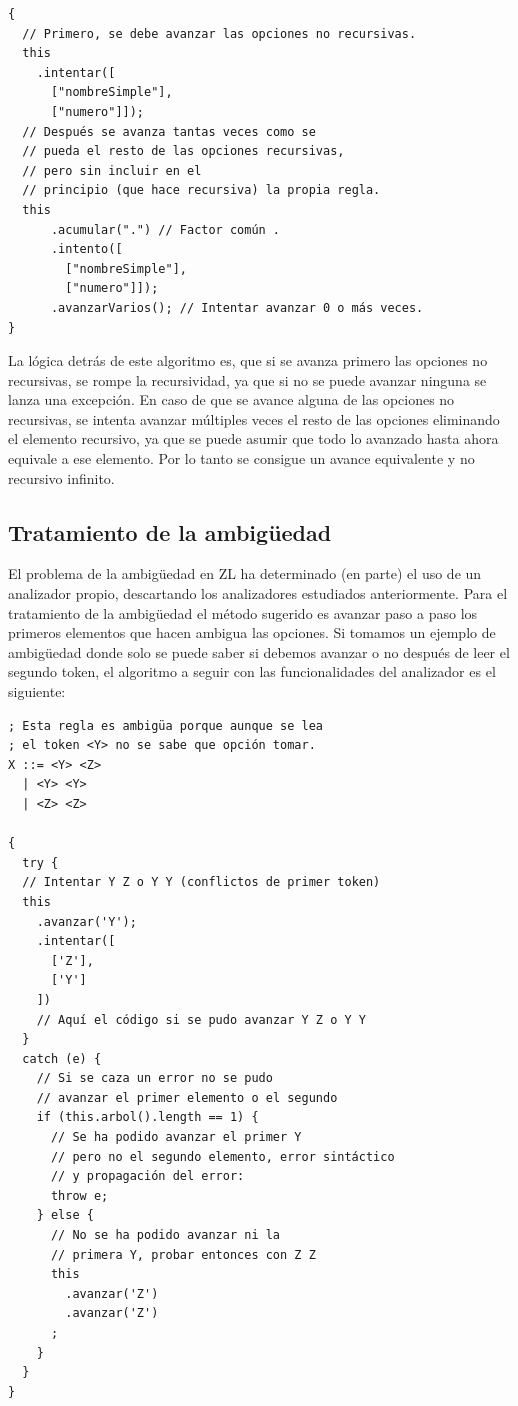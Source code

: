\documentclass{report}
\begin{document}
\begin{BVerbatim}
{
  // Primero, se debe avanzar las opciones no recursivas.
  this
    .intentar([
      ["nombreSimple"],
      ["numero"]]);
  // Después se avanza tantas veces como se 
  // pueda el resto de las opciones recursivas,
  // pero sin incluir en el 
  // principio (que hace recursiva) la propia regla.
  this
	  .acumular(".") // Factor común .
	  .intento([
	    ["nombreSimple"],
	    ["numero"]]);
	  .avanzarVarios(); // Intentar avanzar 0 o más veces.
}
\end{BVerbatim}

	\vspace{10px}

	La lógica detrás de este algoritmo es, que si se avanza primero las opciones no recursivas, se rompe la recursividad, ya que si no se puede avanzar ninguna se lanza una excepción. En caso de que se avance alguna de las opciones no recursivas, se intenta avanzar múltiples veces el resto de las opciones eliminando el elemento recursivo, ya que se puede asumir que todo lo avanzado hasta ahora equivale a ese elemento. Por lo tanto se consigue un avance equivalente y no recursivo infinito. 
	
	\subsection{Tratamiento de la ambigüedad}
	
	El problema de la ambigüedad en ZL ha determinado (en parte) el uso de un analizador propio, descartando los analizadores estudiados anteriormente. Para el tratamiento de la ambigüedad el método sugerido es avanzar paso a paso los primeros elementos que hacen ambigua las opciones. Si tomamos un ejemplo de ambigüedad donde solo se puede saber si debemos avanzar o no después de leer el segundo token, el algoritmo a seguir con las funcionalidades del analizador es el siguiente:
	
\begin{BVerbatim}
; Esta regla es ambigüa porque aunque se lea 
; el token <Y> no se sabe que opción tomar.
X ::= <Y> <Z>
  | <Y> <Y>
  | <Z> <Z>

{
  try {
  // Intentar Y Z o Y Y (conflictos de primer token)
  this
    .avanzar('Y');
    .intentar([
      ['Z'],
      ['Y']
    ])
    // Aquí el código si se pudo avanzar Y Z o Y Y
  }
  catch (e) {
    // Si se caza un error no se pudo 
    // avanzar el primer elemento o el segundo
    if (this.arbol().length == 1) {
      // Se ha podido avanzar el primer Y 
      // pero no el segundo elemento, error sintáctico 
      // y propagación del error:
      throw e;
    } else {
      // No se ha podido avanzar ni la 
      // primera Y, probar entonces con Z Z
      this
        .avanzar('Z')
        .avanzar('Z')
      ;
    }
  }
}
\end{BVerbatim}
\end{document}
